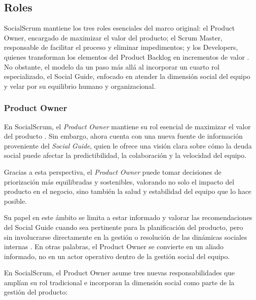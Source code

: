 \subsection{Roles}

SocialScrum mantiene los tres roles esenciales del marco original: el Product Owner, encargado de maximizar el valor del producto; el Scrum Master, responsable de facilitar el proceso y eliminar impedimentos; y los Developers, quienes transforman los elementos del Product Backlog en incrementos de valor \cite{schwaber2020scrum}.
No obstante, el modelo da un paso más allá al incorporar un cuarto rol especializado, el Social Guide, enfocado en atender la dimensión social del equipo y velar por su equilibrio humano y organizacional.

\subsubsection{Product Owner}

En SocialScrum, el \textit{Product Owner} mantiene su rol esencial de maximizar el valor del producto \cite{schwaber2020scrum}. Sin embargo, ahora cuenta con una nueva fuente de información proveniente del \textit{Social Guide}, quien le ofrece una visión clara sobre cómo la deuda social puede afectar la predictibilidad, la colaboración y la velocidad del equipo.

Gracias a esta perspectiva, el \textit{Product Owner} puede tomar decisiones de priorización más equilibradas y sostenibles, valorando no solo el impacto del producto en el negocio, sino también la salud y estabilidad del equipo que lo hace posible.

Su papel en este ámbito se limita a estar informado y valorar las recomendaciones del Social Guide cuando sea pertinente para la planificación del producto, pero sin involucrarse directamente en la gestión o resolución de las dinámicas sociales internas \cite{saeeda2024nontechnicaldebt}.
En otras palabras, el Product Owner se convierte en un aliado informado, no en un actor operativo dentro de la gestión social del equipo.

En SocialScrum, el Product Owner asume tres nuevas responsabilidades que amplían su rol tradicional e incorporan la dimensión social como parte de la gestión del producto:

